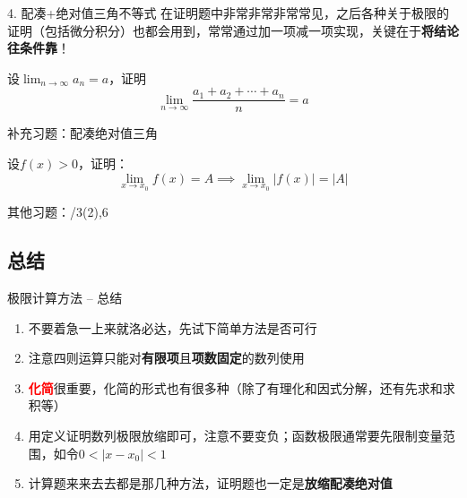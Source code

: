 \documentclass{myslide}
\begin{document}
\begin{frame}{4. 配凑+绝对值三角不等式}
在证明题中非常非常非常常见，之后各种关于极限的证明（包括微分积分）也都会用到，常常通过加一项减一项实现，关键在于\textbf{将结论往条件靠}！
\begin{example}[\textsection 3.2/16]
设$\displaystyle\lim_{n\to\infty}a_n=a$，证明
\[\lim_{n\to\infty}\frac{a_1+a_2+\cdots+a_n}{n}=a\]
\end{example}
\end{frame}

\begin{frame}{补充习题：配凑绝对值三角}
\begin{exercise}[\textsection 3.3/4]
设$f(x)>0$，证明：
\[\lim_{x\to x_0}f(x)=A\implies\lim_{x\to x_0}|f(x)|=|A|\]
\end{exercise}
其他习题：/3(2),6
\end{frame}

\subsection{总结}
\begin{frame}{极限计算方法 -- 总结}
\begin{enumerate}
	\item<1-> 不要着急一上来就洛必达，先试下简单方法是否可行
	\item<2-> 注意四则运算只能对\textbf{有限项}且\textbf{项数固定}的数列使用
	\item<3-> \textcolor{red}{\textbf{化简}}很重要，化简的形式也有很多种（除了有理化和因式分解，还有先求和求积等）
	\item<4-> 用定义证明数列极限放缩即可，注意不要变负；函数极限通常要先限制变量范围，如令$0<|x-x_0|<1$
	\item<5-> 计算题来来去去都是那几种方法，证明题也一定是\textbf{放缩配凑绝对值}
\end{enumerate}
\end{frame}
\end{document}
